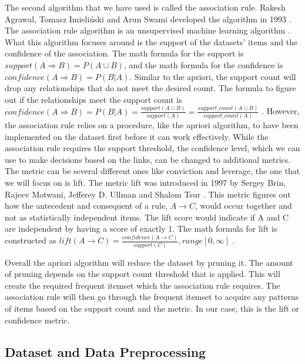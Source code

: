 \documentclass[a4paper,10pt]{article}
\begin{document}
The second algorithm that we have used is called the association rule. Rakesh Agrawal, Tomasz Imieli{\'n}ski and Arun Swami developed the algorithm in 1993 \cite{agrawal1993mining}. The association rule algorithm is an unsupervised machine learning algorithm \cite{geron2019hands}. What this algorithm focuses around is the support of the datasets' items and the confidence of the association. The math formula for the support is $support(A \Rightarrow B) = P(A \cup B)$, and the math formula for the confidence is $confidence(A \Rightarrow B) = P(B|A)$.  Similar to the apriori, the support count will drop any relationships that do not meet the desired count. The formula to figure out if the relationships meet the support count is $confidence(A \Rightarrow B) = P(B|A) = \frac{support(A \cup B)}{support(A)} = \frac{support\_count(A \cup B)}{support\_count(A)}$ \cite{jingjingslides, han2011data}. However, the association rule relies on a procedure, like the apriori algorithm, to have been implemented on the dataset first before it can work effectively. While the association rule requires the support threshold, the confidence level, which we can use to make decisions based on the links, can be changed to additional metrics. The metric can be several different ones like conviction and leverage, the one that we will focus on is lift. The metric lift was introduced in 1997 by Sergey Brin, Rajeev Motwani, Jefferey D. Ullman and Shalom Tsur \cite{brin1997dynamic}. This metric figures out how the antecedent and consequent of a rule, $A \rightarrow C$, would occur together and not as statistically independent items. The lift score would indicate if A and C are independent by having a score of exactly 1. The math formula for lift is constructed as $lift(A \rightarrow C) = \frac{confidence(A \rightarrow C)}{support(C)}, range[0, \infty]$ \cite{brin1997dynamic, jingjingslides}.

Overall the apriori algorithm will reduce the dataset by pruning it. The amount of pruning depends on the support count threshold that is applied. This will create the required frequent itemset which the association rule requires. The association rule will then go through the frequent itemset to acquire any patterns of items based on the support count and the metric. In our case, this is the lift or confidence metric.

\subsection{Dataset and Data Preprocessing}
\end{document}
